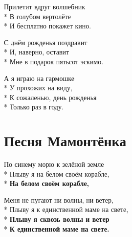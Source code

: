 \medskip

\begin{minipage}{\linewidth}
Прилетит вдруг волшебник\\*
В голубом вертолёте\\*
И бесплатно покажет кино.\\
\end{minipage}\par\medskip\nobreak

\medskip

\begin{minipage}{\linewidth}
С днём рожденья поздравит\\*
И, наверно, оставит\\*
Мне в подарок пятьсот эскимо.\\
\end{minipage}\par\medskip\nobreak

\medskip

\begin{minipage}{\linewidth}
\hspace*{1.5em}А я играю на гармошке\\*
\hspace*{1.5em}У прохожих на виду,\\*
\hspace*{1.5em}К сожаленью, день рожденья\\*
\hspace*{1.5em}Только раз в году.\\
\end{minipage}

\vspace{\fill}\newpage

\section{Песня Мамонтёнка}
\label{song:Песня_Мамонтёнка}

\medskip

\begin{minipage}{\linewidth}
По синему морю к зелёной земле\\*
Плыву я на белом своём корабле,\\*
\textbf{На белом своём корабле,}\\
\end{minipage}\par\medskip\nobreak

\medskip

\begin{minipage}{\linewidth}
Меня не пугают ни волны, ни ветер,\\*
Плыву я к единственной маме на свете,\\*
\textbf{Плыву я сквозь волны и ветер}\\*
\textbf{К единственной маме на свете.}\\
\end{minipage}\par\medskip\nobreak

